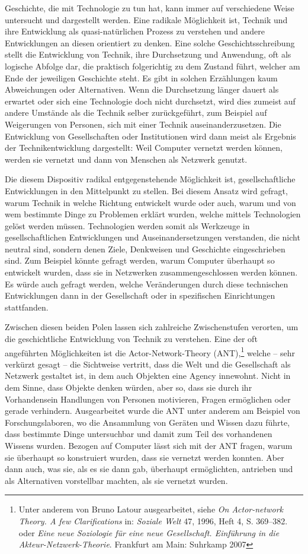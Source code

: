 \documentclass[a4paper,
fontsize=11pt,
oneside,
numbers=noperiodatend,
parskip=half-,
bibliography=totoc,
final
]{scrartcl}
\begin{document}
Geschichte, die mit Technologie zu tun hat, kann immer auf verschiedene
Weise untersucht und dargestellt werden. Eine radikale Möglichkeit ist,
Technik und ihre Entwicklung als quasi-natürlichen Prozess zu verstehen
und andere Entwicklungen an diesen orientiert zu denken. Eine solche
Geschichtsschreibung stellt die Entwicklung von Technik, ihre
Durchsetzung und Anwendung, oft als logische Abfolge dar, die praktisch
folgerichtig zu dem Zustand führt, welcher am Ende der jeweiligen
Geschichte steht. Es gibt in solchen Erzählungen kaum Abweichungen oder
Alternativen. Wenn die Durchsetzung länger dauert als erwartet oder sich
eine Technologie doch nicht durchsetzt, wird dies zumeist auf andere
Umstände als die Technik selber zurückgeführt, zum Beispiel auf
Weigerungen von Personen, sich mit einer Technik auseinanderzusetzen.
Die Entwicklung von Gesellschaften oder Institutionen wird dann meist
als Ergebnis der Technikentwicklung dargestellt: Weil Computer vernetzt
werden können, werden sie vernetzt und dann von Menschen als Netzwerk
genutzt.

Die diesem Dispositiv radikal entgegenstehende Möglichkeit ist,
gesellschaftliche Entwicklungen in den Mittelpunkt zu stellen. Bei
diesem Ansatz wird gefragt, warum Technik in welche Richtung entwickelt
wurde oder auch, warum und von wem bestimmte Dinge zu Problemen erklärt
wurden, welche mittels Technologien gelöst werden müssen. Technologien
werden somit als Werkzeuge in gesellschaftlichen Entwicklungen und
Auseinandersetzungen verstanden, die nicht neutral sind, sondern denen
Ziele, Denkweisen und Geschichte eingeschrieben sind. Zum Beispiel
könnte gefragt werden, warum Computer überhaupt so entwickelt wurden,
dass sie in Netzwerken zusammengeschlossen werden können. Es würde auch
gefragt werden, welche Veränderungen durch diese technischen
Entwicklungen dann in der Gesellschaft oder in spezifischen
Einrichtungen stattfanden.

Zwischen diesen beiden Polen lassen sich zahlreiche Zwischenstufen
verorten, um die geschichtliche Entwicklung von Technik zu verstehen.
Eine der oft angeführten Möglichkeiten ist die Actor-Network-Theory
(ANT),\footnote{Unter anderem von Bruno Latour ausgearbeitet, siehe
  \emph{On Actor-network Theory. A few Clarifications} in: \emph{Soziale
  Welt} 47, 1996, Heft 4, S. 369--382. oder \emph{Eine neue Soziologie
  für eine neue Gesellschaft. Einführung in die
  Akteur-Netzwerk-Theorie}. Frankfurt am Main: Suhrkamp 2007} welche --
sehr verkürzt gesagt -- die Sichtweise vertritt, dass die Welt und die
Gesellschaft als Netzwerk gestaltet ist, in dem auch Objekten eine
Agency innewohnt. Nicht in dem Sinne, dass Objekte denken würden, aber
so, dass sie durch ihr Vorhandensein Handlungen von Personen motivieren,
Fragen ermöglichen oder gerade verhindern. Ausgearbeitet wurde die ANT
unter anderem am Beispiel von Forschungslaboren, wo die Ansammlung von
Geräten und Wissen dazu führte, dass bestimmte Dinge untersuchbar und
damit zum Teil des vorhandenen Wissens wurden. Bezogen auf Computer
lässt sich mit der ANT fragen, warum sie überhaupt so konstruiert
wurden, dass sie vernetzt werden konnten. Aber dann auch, was sie, als
es sie dann gab, überhaupt ermöglichten, antrieben und als Alternativen
vorstellbar machten, als sie vernetzt wurden.
\end{document}

